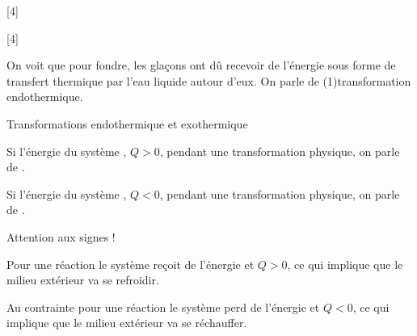 [4]

[4]


\pasCorrection{\newpage}

On voit que pour fondre, les glaçons ont dû recevoir de l'énergie sous forme de transfert thermique par l'eau liquide autour d'eux.
On parle de \texteTrou(1){transformation endothermique.}

\begin{doc}{Transformations endothermique et exothermique}
  \begin{importants}
    \begin{listePoints}
      \item Si l'énergie du système , $Q > 0$, pendant une transformation physique, on parle de .
      \item Si l'énergie du système , $Q < 0$, pendant une transformation physique, on parle de .
    \end{listePoints}
  \end{importants}
  \begin{center}
  \end{center}
  \attention Attention aux signes !
  
  \begin{listePoints}
    \item Pour une réaction  le système reçoit de l'énergie et $Q > 0$, ce qui implique que le milieu extérieur va se refroidir. 
    \item Au contrainte pour une réaction  le système perd de l'énergie et $Q < 0$, ce qui implique que le milieu extérieur va se réchauffer.
  \end{listePoints}
\end{doc}

